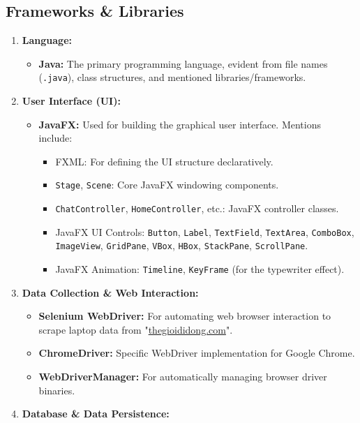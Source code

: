\documentclass{article}
\begin{document}
\subsection{Frameworks \& Libraries}
\begin{enumerate}
    \item \textbf{Language:}
    \begin{itemize}
        \item \textbf{Java:} The primary programming language, evident from file names (\texttt{.java}), class structures, and mentioned libraries/frameworks.
    \end{itemize}
    \item \textbf{User Interface (UI):}
    \begin{itemize}
        \item \textbf{JavaFX:} Used for building the graphical user interface. Mentions include:
        \begin{itemize}
            \item FXML: For defining the UI structure declaratively.
            \item \texttt{Stage}, \texttt{Scene}: Core JavaFX windowing components.
            \item \texttt{ChatController}, \texttt{HomeController}, etc.: JavaFX controller classes.
            \item JavaFX UI Controls: \texttt{Button}, \texttt{Label}, \texttt{TextField}, \texttt{TextArea}, \texttt{ComboBox}, \texttt{ImageView}, \texttt{GridPane}, \texttt{VBox}, \texttt{HBox}, \texttt{StackPane}, \texttt{ScrollPane}.
            \item JavaFX Animation: \texttt{Timeline}, \texttt{KeyFrame} (for the typewriter effect).
        \end{itemize}
    \end{itemize}
    \item \textbf{Data Collection \& Web Interaction:}
    \begin{itemize}
        \item \textbf{Selenium WebDriver:} For automating web browser interaction to scrape laptop data from "\url{thegioididong.com}".
        \item \textbf{ChromeDriver:} Specific WebDriver implementation for Google Chrome.
        \item \textbf{WebDriverManager:} For automatically managing browser driver binaries.
    \end{itemize}
    \item \textbf{Database \& Data Persistence:}

\end{enumerate}
\end{document}
